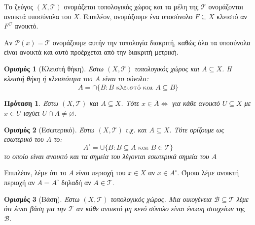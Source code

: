 \documentclass[oneside,a4paper]{article}
\newtheorem*{defn}{Ορισμός}
\newtheorem{prop}{Πρόταση}
\begin{document}
\noindent Το ζεύγος $(X,\mathcal T)$ ονομάζεται τοπολογικός χώρος και τα μέλη της $\mathcal T$ ονομάζονται ανοικτά υποσύνολα του $X$. Επιπλέον, ονομάζουμε ένα υποσύνολο $F\subseteq X$ κλειστό αν $F^C$ ανοικτό.

\noindent Αν $\mathcal P (x) = \mathcal T$ ονομάζουμε αυτήν την τοπολογία διακριτή, καθώς όλα τα υποσύνολα είναι ανοικτά και αυτό προέρχεται από την διακριτή μετρική.


\begin{defn}[Κλειστή θήκη]
	Έστω $(X,\mathcal T)$ τοπολογικός χώρος και $A \subseteq X$. Η κλειστή θήκη ή κλειστότητα του $A$ είναι το σύνολο:
	$$\overline{A} = \cap \{B: B \text{ κλειστό και } A\subseteq B\}$$
\end{defn}

\begin{prop}
	Έστω $(X,\mathcal T)$ και $A \subseteq X$. Τότε $x\in \overline A \iff$ για κάθε ανοικτό $U \subseteq X$ με $x \in U$ ισχύει $U\cap A \neq \varnothing$.
\end{prop}

\begin{defn}[Εσωτερικό]
	Έστω $(X,\mathcal T)$ τ.χ. και $A \subseteq X$. Τότε ορίζουμε ως εσωτερικό του $A$ το:
	$$A^{\circ} = \cup \{B: B\subseteq A \text{ και } B \in \mathcal T\}$$
	το οποίο είναι ανοικτό και τα σημεία του λέγονται εσωτερικά σημεία του $A$
\end{defn}

\noindent Επιπλέον, λέμε ότι το $A$ είναι περιοχή του $x \in X$ αν $x \in A^{\circ}$. Όμοια λέμε ανοικτή περιοχή αν $A=A^{\circ}$ δηλαδή αν $A \in \mathcal T$.

\begin{defn}[Βάση]
	Έστω $(X,\mathcal T)$ τοπολογικός χώρος. Μια οικογένεια $\mathcal B \subseteq \mathcal T$ λέμε ότι έιναι βάση για την $\mathcal T$ αν κάθε ανοικτό μη κενό σύνολο είναι ένωση στοιχείων της $\mathcal B$.
\end{defn}
\end{document}
